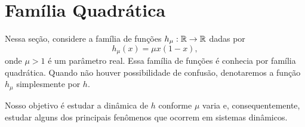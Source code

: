 \section{Família Quadrática}

Nessa seção, considere a família de funções $h_\mu: \mathbb{R} \to \mathbb{R}$ dadas por
$$h_\mu(x) = \mu x(1-x),$$
onde $\mu > 1$ é um parâmetro real.
Essa família de funções é conhecia por família quadrática.
Quando não houver possibilidade de confusão, denotaremos a função $h_\mu$ simplesmente por $h$.

Nosso objetivo é estudar a dinâmica de $h$ conforme $\mu$ varia e, consequentemente, estudar alguns dos principais fenômenos que ocorrem em sistemas dinâmicos.